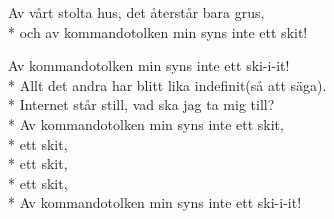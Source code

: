 \begin{SongText}[Kommandotolken]
\begin{SongVerse}
        Av vårt stolta hus, det återstår bara grus,\\*%
        och av kommandotolken min syns inte ett skit!
    \end{SongVerse}
    \begin{SongVerse}
        Av kommandotolken min syns inte ett ski-i-it!\\*%
        Allt det andra har blitt lika indefinit(så att säga).\\*%
        Internet står still, vad ska jag ta mig till?\\*%
        Av kommandotolken min syns inte ett skit,\\*%
        ett skit,\\*%
        ett skit,\\*%
        ett skit,\\*%
        Av kommandotolken min syns inte ett ski-i-it!
    \end{SongVerse}
\end{SongText}
